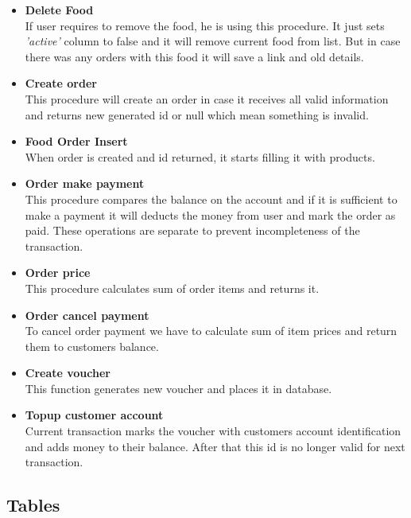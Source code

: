 \begin{itemize}
\item \textbf{Delete Food}
\\
If user requires to remove the food, he is using this procedure. It just sets \textit{'active'} column to false and it will remove current food from list. But in case there was any orders with this food it will save a link and old details.


\item \textbf{Create order}
\\
This procedure will create an order in case it receives all valid information and returns new generated id or null which mean something is invalid.

\item \textbf{Food Order  Insert}
\\
When order is created and id returned, it starts filling it with products. 

\item \textbf{Order make payment}
\\
This procedure compares the balance on the account and if it is sufficient to make a payment it will deducts the money from user and mark the order as paid. These operations are separate to prevent incompleteness of the transaction. 

\item \textbf{Order price}
\\
This procedure calculates sum of order items and returns it.

\item \textbf{Order cancel payment}
\\
To cancel order payment we have to calculate sum of item prices and return them to customers balance.

\item \textbf{Create voucher}
\\
This function generates new voucher and places it in database.

\item \textbf{Topup customer account}
\\
Current transaction marks the voucher with customers account identification and adds money to their balance. After that this id is no longer valid for next transaction.


\end{itemize}
 
    \subsection{Tables}
    
